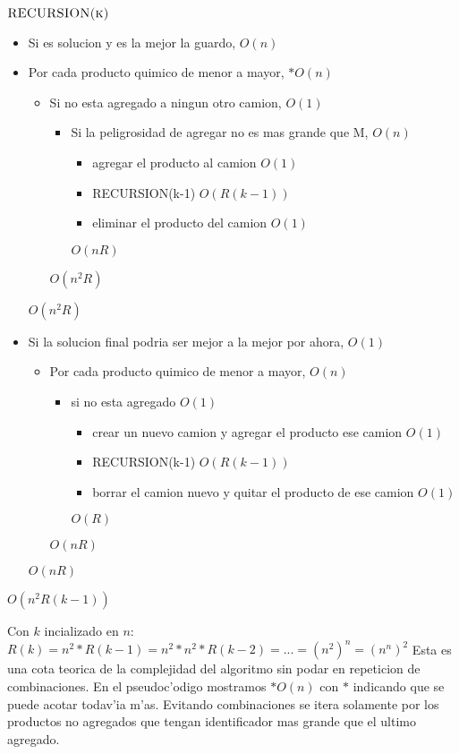 $\textnormal{\scshape RECURSION(k)}$
\begin{itemize}
\item Si es solucion y es la mejor la guardo,						$O(n)$
\item Por cada producto quimico de menor a mayor, 						$*O(n)$
	\begin{itemize}
	\item Si no esta agregado a ningun otro camion,						$O(1)$			
		\begin{itemize}
		\item Si la peligrosidad de agregar no es mas grande que M,		$O(n)$
			\begin{itemize}
			\item agregar el producto al camion							$O(1)$
			\item RECURSION(k-1)											$O(R(k-1))$
			\item eliminar el producto del camion							$O(1)$
			\end{itemize}													$O(nR)$
		\end{itemize}													$O(n^2R)$
	\end{itemize}															$O(n^2R)$
\item Si la solucion final podria ser mejor a la mejor por ahora,				$O(1)$
	\begin{itemize}
	\item Por cada producto quimico de menor a mayor,								$O(n)$
		\begin{itemize}
		\item si no esta agregado													$O(1)$
			\begin{itemize}
			\item crear un nuevo camion y agregar el producto ese camion			$O(1)$
			\item RECURSION(k-1)													$O(R(k-1))$
			\item borrar el camion nuevo y quitar el producto de ese camion		$O(1)$
			\end{itemize}						$O(R)$
		\end{itemize}						$O(nR)$
	\end{itemize}						$O(nR)$
\end{itemize}	$O(n^2R(k-1))$


Con $k$ incializado en $n$:
$R(k) = n^2*R(k-1) = n^2*n^2*R(k-2) = ... = (n^2)^n = (n^n)^2$
Esta es una cota teorica de la complejidad del algoritmo sin podar en repeticion de combinaciones. 
En el pseudoc'odigo mostramos $*O(n)$ con $*$ indicando que se puede acotar todav'ia m'as. Evitando combinaciones se itera solamente por los productos no agregados que tengan identificador mas grande que el ultimo agregado.


